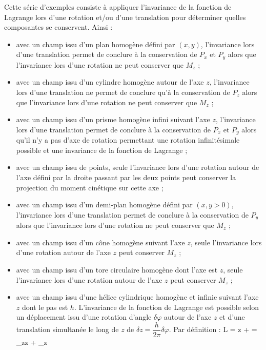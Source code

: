 Cette s\'erie d'exemples consiste \`a appliquer l'invariance de la fonction de Lagrange lors d'une rotation et/ou d'une translation pour d\'eterminer quelles composantes se conservent. Ainsi :
\begin{itemize}
	\item[a)] avec un champ issu d'un plan homog\`ene d\'efini par $(x,y)$, l'invariance lors d'une translation permet de conclure \`a la conservation de $P_{x}$ et $P_{y}$ alors que l'invariance lors d'une rotation ne peut conserver que $M_{z}$ ;
	\item[b)] avec un champ issu d'un cylindre homog\`ene autour de l'axe $z$, l'invariance lors d'une translation ne permet de conclure qu'\`a la conservation de $P_{z}$ alors que l'invariance lors d'une rotation ne peut conserver que $M_{z}$ ;
	\item[c)] avec un champ issu d'un prisme homog\`ene infini suivant l'axe $z$, l'invariance lors d'une translation permet de conclure \`a la conservation de $P_{x}$ et $P_{y}$ alors qu'il n'y a pas d'axe de rotation permettant une rotation infinit\'esimale possible et une invariance de la fonction de Lagrange ;
	\item[d)] avec un champ issu de points, seule l'invariance lors d'une rotation autour de l'axe d\'efini par la droite passant par les deux points peut conserver la projection du moment cin\'etique sur cette axe ;
	\item[e)] avec un champ issu d'un demi-plan homog\`ene d\'efini par $(x,y > 0)$, l'invariance lors d'une translation permet de conclure \`a la conservation de $P_{y}$ alors que l'invariance lors d'une rotation ne peut conserver que $M_{z}$ ;
	\item[f)] avec un champ issu d'un c\^one homog\`ene suivant l'axe $z$, seule l'invariance lors d'une rotation autour de l'axe $z$ peut conserver $M_{z}$ ;
	\item[g)] avec un champ issu d'un tore circulaire homog\`ene dont l'axe est $z$, seule l'invariance lors d'une rotation autour de l'axe $z$ peut conserver $M_{z}$ ;
	\item[h)] avec un champ issu d'une h\'elice cylindrique homog\`ene et infinie suivant l'axe $z$ dont le pas est $h$. L'invariance de la fonction de Lagrange est possible selon un d\'eplacement issu d'une rotation d'angle $\delta\varphi$ autour de l'axe $z$ et d'une translation simultan\'ee le long de $z$ de $\delta z = \dfrac{h}{2\pi}\delta\varphi$. Par d\'efinition :
		\benn
			\delta L = \delta z + \delta\varphi = _{z}\delta z + _{z}\delta\varphi

\end{itemize}
